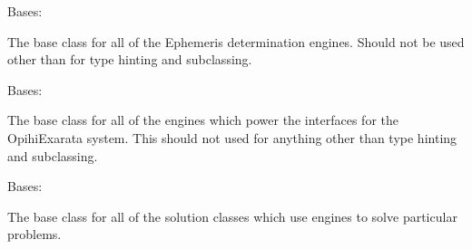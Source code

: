 \documentclass[letterpaper,11pt,english]{sphinxmanual}
\begin{document}

\begin{savenotes}\begin{fulllineitems}
\label{\detokenize{code/opihiexarata.library.engine:opihiexarata.library.engine.EphemerisEngine}}
\pysigstartsignatures
{}
\pysigstopsignatures
\sphinxAtStartPar
Bases: {\hyperref[\detokenize{code/opihiexarata.library.engine:opihiexarata.library.engine.ExarataEngine}]{}}

\sphinxAtStartPar
The base class for all of the Ephemeris determination engines. Should not
be used other than for type hinting and subclassing.

\end{fulllineitems}\end{savenotes}


\begin{savenotes}\begin{fulllineitems}
\label{\detokenize{code/opihiexarata.library.engine:opihiexarata.library.engine.ExarataEngine}}
\pysigstartsignatures
{}
\pysigstopsignatures
\sphinxAtStartPar
Bases: 

\sphinxAtStartPar
The base class for all of the engines which power the interfaces for
the OpihiExarata system. This should not used for anything other than
type hinting and subclassing.

\end{fulllineitems}\end{savenotes}


\begin{savenotes}\begin{fulllineitems}
\label{\detokenize{code/opihiexarata.library.engine:opihiexarata.library.engine.ExarataSolution}}
\pysigstartsignatures
{}
\pysigstopsignatures
\sphinxAtStartPar
Bases: 

\sphinxAtStartPar
The base class for all of the solution classes which use engines to
solve particular problems.

\end{fulllineitems}\end{savenotes}
\end{document}
